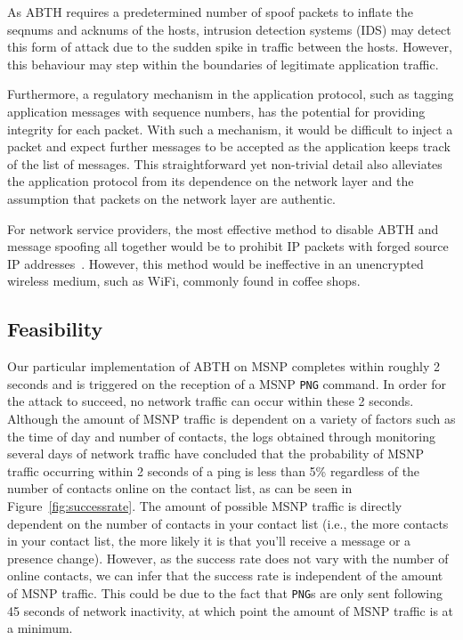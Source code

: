 \documentclass{sig-alternate}
\begin{document}
As ABTH requires a predetermined number of spoof packets to inflate the seqnums and acknums of the hosts, intrusion detection systems (IDS) may detect this form of attack due to the sudden spike in traffic between the hosts.
However, this behaviour may step within the boundaries of legitimate application traffic.

Furthermore, a regulatory mechanism in the application protocol, such as tagging application messages with sequence numbers, has the potential for providing integrity for each packet.
With such a mechanism, it would be difficult to inject a packet and expect further messages to be accepted as the application keeps track of the list of messages.
This straightforward yet non-trivial detail also alleviates the application protocol from its dependence on the network layer and the assumption that packets on the network layer are authentic.

For network service providers, the most effective method to disable ABTH and message spoofing all together would be to prohibit IP packets with forged source IP addresses~\cite{templeton:spoof}.
However, this method would be ineffective in an unencrypted wireless medium, such as WiFi, commonly found in coffee shops.

\subsection{Feasibility}

Our particular implementation of ABTH on MSNP completes within roughly 2 seconds and is triggered on the reception of a MSNP \texttt{PNG} command.
In order for the attack to succeed, no network traffic can occur within these 2 seconds.
Although the amount of MSNP traffic is dependent on a variety of factors such as the time of day and number of contacts, the logs obtained through monitoring several days of network traffic have concluded that the probability of MSNP traffic occurring within 2 seconds of a ping is less than 5\% regardless of the number of contacts online on the contact list, as can be seen in Figure~\ref{fig:successrate}.
The amount of possible MSNP traffic is directly dependent on the number of contacts in your contact list (i.e., the more contacts in your contact list, the more likely it is that you'll receive a message or a presence change). 
However, as the success rate does not vary with the number of online contacts, we can infer that the success rate is independent of the amount of MSNP traffic.
This could be due to the fact that \texttt{PNG}s are only sent following 45 seconds of network inactivity, at which point the amount of MSNP traffic is at a minimum.
\end{document}
